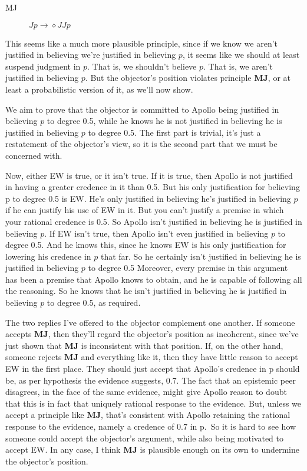 \documentclass[
  11pt,
  letterpaper,
  DIV=11,
  numbers=noendperiod,
  oneside]{scrartcl}
\begin{document}
\begin{description}
\item[MJ]
\(Jp \rightarrow \diamond JJp\)
\end{description}

This seems like a much more plausible principle, since if we know we
aren't justified in believing we're justified in believing \(p\), it
seems like we should at least suspend judgment in \(p\). That is, we
shouldn't believe \(p\). That is, we aren't justified in believing
\(p\). But the objector's position violates principle \textbf{MJ}, or at
least a probabilistic version of it, as we'll now show.

We aim to prove that the objector is committed to Apollo being justified
in believing \(p\) to degree 0.5, while he knows he is not justified in
believing he is justified in believing \(p\) to degree 0.5. The first
part is trivial, it's just a restatement of the objector's view, so it
is the second part that we must be concerned with.

Now, either EW is true, or it isn't true. If it is true, then Apollo is
not justified in having a greater credence in it than 0.5. But his only
justification for believing p to degree 0.5 is EW. He's only justified
in believing he's justified in believing \(p\) if he can justify his use
of EW in it. But you can't justify a premise in which your rational
credence is 0.5. So Apollo isn't justified in believing he is justified
in believing \(p\). If EW isn't true, then Apollo isn't even justified
in believing \(p\) to degree 0.5. And he knows this, since he knows EW
is his only justification for lowering his credence in \(p\) that far.
So he certainly isn't justified in believing he is justified in
believing \(p\) to degree 0.5 Moreover, every premise in this argument
has been a premise that Apollo knows to obtain, and he is capable of
following all the reasoning. So he knows that he isn't justified in
believing he is justified in believing \(p\) to degree 0.5, as required.

The two replies I've offered to the objector complement one another. If
someone accepts \textbf{MJ}, then they'll regard the objector's position
as incoherent, since we've just shown that \textbf{MJ} is inconsistent
with that position. If, on the other hand, someone rejects \textbf{MJ}
and everything like it, then they have little reason to accept EW in the
first place. They should just accept that Apollo's credence in p should
be, as per hypothesis the evidence suggests, 0.7. The fact that an
epistemic peer disagrees, in the face of the same evidence, might give
Apollo reason to doubt that this is in fact that uniquely rational
response to the evidence. But, unless we accept a principle like
\textbf{MJ}, that's consistent with Apollo retaining the rational
response to the evidence, namely a credence of 0.7 in p.~So it is hard
to see how someone could accept the objector's argument, while also
being motivated to accept EW. In any case, I think \textbf{MJ} is
plausible enough on its own to undermine the objector's
position.
\end{document}
